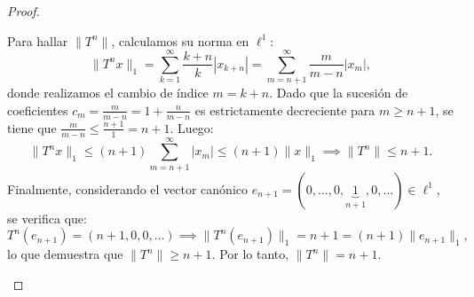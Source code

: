 \documentclass{article}
\theoremstyle{definition}
\begin{document}
\begin{proof}
\begin{enumerate}
              Para hallar \( \|T^n\| \), calculamos su norma en \(\ell^1\):
              \[
                  \|T^n x\|_1 = \sum_{k=1}^\infty \frac{k+n}{k} |x_{k+n}| = \sum_{m=n+1}^\infty \frac{m}{m-n} |x_m|,
              \]
              donde realizamos el cambio de índice \(m = k+n\). Dado que la sucesión de coeficientes \(c_m = \frac{m}{m-n} = 1 + \frac{n}{m-n}\) es estrictamente decreciente para \(m \ge n+1\), se tiene que \(\frac{m}{m-n} \le \frac{n+1}{1} = n+1\). Luego:
              \[
                  \|T^n x\|_1 \le (n+1) \sum_{m=n+1}^\infty |x_m| \le (n+1) \|x\|_1 \implies \|T^n\| \le n+1.
              \]
              Finalmente, considerando el vector canónico \(e_{n+1} = (0,\dots,0,\underbrace{1}_{n+1},0,\dots) \in \ell^1\), se verifica que:
              \[
                  T^n(e_{n+1}) = (n+1, 0, 0, \dots) \implies \|T^n(e_{n+1})\|_1 = n+1 = (n+1)\|e_{n+1}\|_1,
              \]
              lo que demuestra que \( \|T^n\| \ge n+1 \). Por lo tanto, \( \|T^n\| = n+1 \).
    \end{enumerate}
\end{proof}

\vspace{0.5cm}
\end{document}
